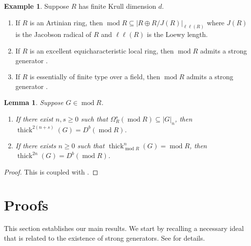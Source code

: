 \documentclass[11pt]{amsart}
\theoremstyle{plain}
\newtheorem{lemma}[theorem]{Lemma}
\theoremstyle{definition}
\newtheorem{example}[theorem]{Example}
\numberwithin{equation}{section}
\numberwithin{theorem}{section}
\begin{document}
\begin{example}\label{ex:Iyengar/Takahashi_strong_gen_examples}
    Suppose $R$ has finite Krull dimension $d$.
    \begin{enumerate}
        \item If $R$ is an Artinian ring, then $\operatorname{mod}R \subseteq |R\oplus R/J(R)|_{\ell\ell(R)}$ where $J(R)$ is the Jacobson radical of $R$ and $\ell\ell(R)$ is the Loewy length.
        \item If $R$ is an excellent equicharacteristic local ring, then $\operatorname{mod}R$ admits a strong generator \cite[Theorem 5.3]{Iyengar/Takahashi:2016}.
        \item If $R$ is essentially of finite type over a field, then $\operatorname{mod}R$ admits a strong generator \cite[Theorem 5.4]{Iyengar/Takahashi:2016}.
    \end{enumerate}
\end{example}

\begin{lemma}\label{lem:strong_generation_module_to_derived}
    Suppose $G\in \operatorname{mod}R$.
    \begin{enumerate}
        \item If there exist $n,s\geq 0$ such that $\Omega_R^s (\operatorname{mod}R) \subseteq |G|_n$, then $\operatorname{thick}^{2(n+s)} (G) = D^b (\operatorname{mod}R)$.
        \item If there exists $n\geq 0$ such that $\operatorname{thick}_{\operatorname{mod}R}^n (G)= \operatorname{mod}R$, then $\operatorname{thick}^{2n} (G) = D^b (\operatorname{mod}R)$.
    \end{enumerate}
\end{lemma}

\begin{proof}
    This is  coupled with \cite[Lemma 7.1]{Iyengar/Takahashi:2016}.
\end{proof}

\section{Proofs}
\label{sec:proofs}

This section establishes our main results. We start by recalling a necessary ideal that is related to the existence of strong generators. See \cite[Section 2]{Iyengar/Takahashi:2016} for details.
\end{document}

